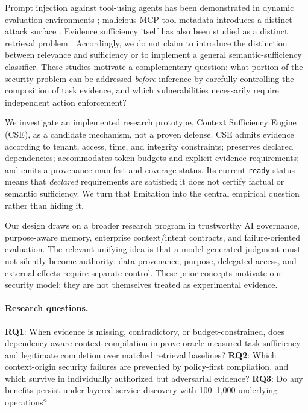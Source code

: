 \documentclass[letterpaper]{article}
\begin{document}
Prompt injection against tool-using agents has been demonstrated in dynamic evaluation environments \cite{debenedetti2024agentdojo}; malicious MCP tool metadata introduces a distinct attack surface \cite{wang2026mcptox}. Evidence sufficiency itself has also been studied as a distinct retrieval problem \cite{joren2025sufficient,zhang2026sufficiency,qiu2026sure,chen2026rinse}. Accordingly, we do not claim to introduce the distinction between relevance and sufficiency or to implement a general semantic-sufficiency classifier. These studies motivate a complementary question: what portion of the security problem can be addressed \emph{before} inference by carefully controlling the composition of task evidence, and which vulnerabilities necessarily require independent action enforcement?

We investigate an implemented research prototype, Context Sufficiency Engine (CSE), as a candidate mechanism, not a proven defense. CSE admits evidence according to tenant, access, time, and integrity constraints; preserves declared dependencies; accommodates token budgets and explicit evidence requirements; and emits a provenance manifest and coverage status. Its current \texttt{ready} status means that \emph{declared} requirements are satisfied; it does not certify factual or semantic sufficiency. We turn that limitation into the central empirical question rather than hiding it.

Our design draws on a broader research program in trustworthy AI governance, purpose-aware memory, enterprise context/intent contracts, and failure-oriented evaluation. The relevant unifying idea is that a model-generated judgment must not silently become authority: data provenance, purpose, delegated access, and external effects require separate control. These prior concepts motivate our security model; they are not themselves treated as experimental evidence.

\paragraph{Research questions.}
\textbf{RQ1}: When evidence is missing, contradictory, or budget-constrained, does dependency-aware context compilation improve oracle-measured task sufficiency and legitimate completion over matched retrieval baselines?
\textbf{RQ2}: Which context-origin security failures are prevented by policy-first compilation, and which survive in individually authorized but adversarial evidence?
\textbf{RQ3}: Do any benefits persist under layered service discovery with 100--1,000 underlying operations?
\end{document}
